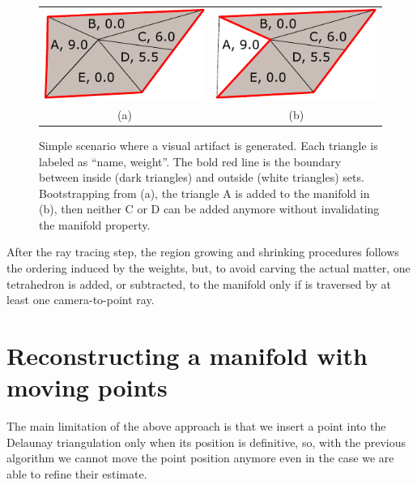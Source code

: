 \begin{figure}
\centering
\begin{tabular}{cc}
\includegraphics[width=0.35\columnwidth]{./img//artifacts01}&
\includegraphics[width=0.35\columnwidth]{./img//artifacts02}\\
(a) & (b)
\end{tabular}
\caption{Simple scenario where a visual artifact is generated. Each triangle is labeled as ``name, weight''. The bold red line is the boundary between inside (dark triangles) and outside (white triangles) sets. Bootstrapping from (a), the triangle A is added to the manifold in (b), then neither C or D can be added anymore without invalidating the manifold property.}
\label{fig:artifact}
\end{figure}

After the ray tracing step, the region growing and shrinking procedures follows the ordering induced by the weights, but, to avoid carving the actual matter, one tetrahedron is added, or subtracted, to the manifold only if is traversed by at least one camera-to-point ray.




\section{Reconstructing a manifold with moving points}
\label{sec:3D-Reconstruction_2}

The main limitation of the above approach is that we insert a point into the Delaunay triangulation only when its position is definitive, so, with the previous algorithm we cannot move the point position anymore even in the case we are able to refine their estimate. 

